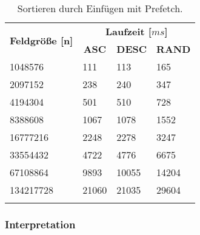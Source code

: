\begin{center}
	\begin{longtable}{|p{5cm}|p{3cm}|p{3cm}|p{3cm}|}
		\hline
		
		\multirow{2}{5cm}{\centering \textbf{Feldgröße [n]}} & \multicolumn{3}{|c|}{ \textbf{Laufzeit [$ms$]}} \\\cline{2-4}
		& \multicolumn{1}{|c|}{\textbf{ASC}} & \multicolumn{1}{|c|}{\textbf{DESC}} &\multicolumn{1}{|c|}{\textbf{RAND}} \\
		\hhline{|=|=|=|=|}
		
		1048576 & 111 & 113 & 165\\
		\hline
		2097152 & 238 & 240 & 347\\
		\hline
		4194304 & 501 & 510 & 728\\
		\hline
		8388608 & 1067 & 1078 & 1552\\
		\hline
		16777216 & 2248 & 2278 & 3247\\
		\hline
		33554432 & 4722 & 4776 & 6675\\
		\hline
		67108864 & 9893 & 10055 & 14204\\
		\hline
		134217728 & 21060 & 21035 & 29604\\
		\hline
		
		\caption{Sortieren durch Einfügen mit Prefetch.}
		\label{tab:insertionsort-v2}
	\end{longtable}
\end{center}

\subsubsection{Interpretation}